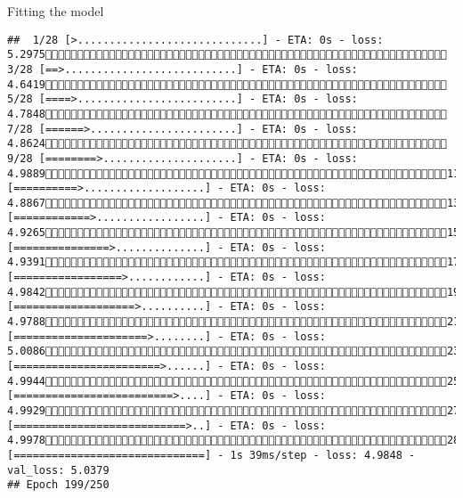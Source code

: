 \documentclass[
  ignorenonframetext,
]{beamer}
\begin{document}
\begin{frame}[fragile]{Fitting the model}
\begin{verbatim}
##  1/28 [>.............................] - ETA: 0s - loss: 5.2975 3/28 [==>...........................] - ETA: 0s - loss: 4.6419 5/28 [====>.........................] - ETA: 0s - loss: 4.7848 7/28 [======>.......................] - ETA: 0s - loss: 4.8624 9/28 [========>.....................] - ETA: 0s - loss: 4.988911/28 [==========>...................] - ETA: 0s - loss: 4.886713/28 [============>.................] - ETA: 0s - loss: 4.926515/28 [===============>..............] - ETA: 0s - loss: 4.939117/28 [=================>............] - ETA: 0s - loss: 4.984219/28 [===================>..........] - ETA: 0s - loss: 4.978821/28 [=====================>........] - ETA: 0s - loss: 5.008623/28 [=======================>......] - ETA: 0s - loss: 4.994425/28 [=========================>....] - ETA: 0s - loss: 4.992927/28 [===========================>..] - ETA: 0s - loss: 4.997828/28 [==============================] - 1s 39ms/step - loss: 4.9848 - val_loss: 5.0379
## Epoch 199/250

\end{verbatim}
\end{frame}
\end{document}
